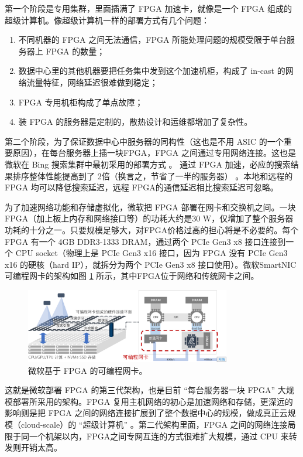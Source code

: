 第一个阶段是专用集群，里面插满了 FPGA 加速卡，就像是一个 FPGA 组成的超级计算机。像超级计算机一样的部署方式有几个问题：

\begin{enumerate}
	\item 不同机器的 FPGA 之间无法通信，FPGA 所能处理问题的规模受限于单台服务器上 FPGA 的数量；
	\item 数据中心里的其他机器要把任务集中发到这个加速机柜，构成了 in-cast 的网络流量特征，网络延迟很难做到稳定；
	\item FPGA 专用机柜构成了单点故障；
	\item 装 FPGA 的服务器是定制的，散热设计和运维都增加了复杂性。
\end{enumerate}

第二个阶段，为了保证数据中心中服务器的同构性（这也是不用 ASIC 的一个重要原因），在每台服务器上插一块FPGA，FPGA 之间通过专用网络连接。这也是微软在 Bing 搜索集群中最初采用的部署方式 \cite{putnam2014reconfigurable}。
通过 FPGA 加速，必应的搜索结果排序整体性能提高到了 2倍（换言之，节省了一半的服务器） \cite{putnam2014reconfigurable}。本地和远程的 FPGA 均可以降低搜索延迟，远程 FPGA的通信延迟相比搜索延迟可忽略。

为了加速网络功能和存储虚拟化，微软把 FPGA 部署在网卡和交换机之间。一块 FPGA（加上板上内存和网络接口等）的功耗大约是30 W，仅增加了整个服务器功耗的十分之一。只要规模足够大，对FPGA价格过高的担心将是不必要的。每个 FPGA 有一个 4GB DDR3-1333 DRAM，通过两个 PCIe Gen3 x8 接口连接到一个 CPU socket（物理上是 PCIe Gen3 x16 接口，因为 FPGA 没有 PCIe Gen3 x16 的硬核（hard IP），就拆分为两个 PCIe Gen3 x8 接口使用）。微软SmartNIC可编程网卡的架构如图 \ref{background:fig:azure_fpga} 所示，其中FPGA位于网络和传统网卡之间。

\begin{figure}[htbp]
	\centering
	\includegraphics[width=0.8\textwidth]{figures/azure_fpga.pdf}
	\caption{微软基于 FPGA 的可编程网卡。}
	\label{background:fig:azure_fpga}
\end{figure}

这就是微软部署 FPGA 的第三代架构，也是目前 ``每台服务器一块 FPGA'' 大规模部署所采用的架构。FPGA 复用主机网络的初心是加速网络和存储，更深远的影响则是把 FPGA 之间的网络连接扩展到了整个数据中心的规模，做成真正云规模（cloud-scale）的 ``超级计算机'' \cite{configurable-cloud-acceleration}。第二代架构里面，FPGA 之间的网络连接局限于同一个机架以内，FPGA之间专网互连的方式很难扩大规模，通过 CPU 来转发则开销太高。

